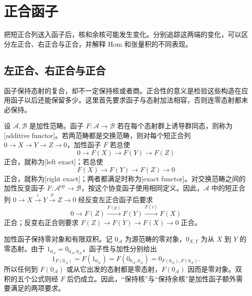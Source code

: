 
\section{正合函子}
\label{b4:sec:0403}

把短正合列送入函子后，核和余核可能发生变化。分别追踪这两端的变化，可以区分左正合、右正合与正合，并解释 Hom 和张量积的不同表现。

%
%

\subsection{左正合、右正合与正合}
\label{b4:subsec:0403:01}

函子保持态射的复合，却不一定保持核或者商。正合性的意义是检验这些构造在应用函子以后还能保留多少。这里首先要求函子与态射加法相容，否则连零态射都未必保持。

\begin{definition}\label{b4:def:exact-functor}
	设 \(\mathcal A,\mathcal B\) 是加性范畴。函子 \(F:\mathcal A\to\mathcal B\) 若在每个态射群上诱导群同态，则称为[additive functor]。若两范畴都是交换范畴，则对每个短正合列 \(0\to X\to Y\to Z\to0\)，加性函子 \(F\) 若总使
	\[
		0\longrightarrow F(X)\longrightarrow F(Y)\longrightarrow F(Z)
	\]
	正合，就称为[left exact]；若总使
	\[
		F(X)\longrightarrow F(Y)\longrightarrow F(Z)\longrightarrow0
	\]
	正合，就称为[right exact]；两者都满足时称为[exact functor]。对交换范畴之间的加性反变函子 \(F:\mathcal A^{\mathrm{op}}\to\mathcal B\)，按这个协变函子使用相同定义。因此，\(\mathcal A\) 中的短正合列 \(0\to X\xrightarrow iY\xrightarrow pZ\to0\) 经反变左正合函子后要求
	\[
		0\longrightarrow F(Z)\xrightarrow{F(p)}F(Y)\xrightarrow{F(i)}F(X)
	\]
	正合；反变右正合则要求 \(F(Z)\to F(Y)\to F(X)\to0\) 正合。
\end{definition}

加性函子保持零对象和有限双积。记 \(0_{\mathcal A}\) 为源范畴的零对象，\(0_{X,Y}\) 为从 \(X\) 到 \(Y\) 的零态射。由于 \(1_{0_{\mathcal A}}=0_{0_{\mathcal A},0_{\mathcal A}}\)，函子性与加性分别给出
\[
	1_{F(0_{\mathcal A})} =F(1_{0_{\mathcal A}}) =F(0_{0_{\mathcal A},0_{\mathcal A}}) =0_{F(0_{\mathcal A}),F(0_{\mathcal A})}.
\]
所以任何到 \(F(0_{\mathcal A})\) 或从它出发的态射都是零态射，\(F(0_{\mathcal A})\) 因而是零对象。双积的五个公式则经 \(F\) 后仍成立。因此，“保持核”与“保持余核”是加性函子额外需要满足的两项要求。

